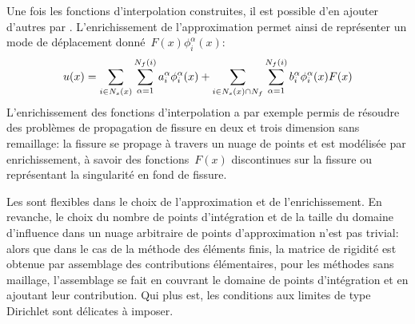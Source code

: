 \medskip
Une fois les fonctions d'interpolation construites, il est possible d'en ajouter d'autres par . L'enrichissement de l'approximation permet ainsi de représenter un mode de déplacement donné~$F(x)\phi_i^\alpha(x)$:
\begin{equation}
u(x) = \displaystyle\sum_{i\in N_s(x)}\displaystyle\sum_{\alpha=1}^{N_f(i)} a_i^\alpha \phi_i^\alpha(x) + \displaystyle\sum_{i\in N_s(x)\cap N_f}\displaystyle\sum_{\alpha=1}^{N_f(i)} b_i^\alpha\phi_i^\alpha(x)F(x)
\end{equation}
L'enrichissement des fonctions d'interpolation a par exemple permis de résoudre des problèmes de propagation de fissure en deux et trois dimension sans remaillage: la fissure se propage à travers un nuage de points et est modélisée par enrichissement, à savoir des fonctions~$F(x)$ discontinues sur la fissure ou représentant la singularité en fond de fissure.

\medskip
Les  sont flexibles dans le choix de l'approximation et de l'enrichissement. En revanche, le choix du nombre de points d'intégration et de la taille du domaine d'influence dans un nuage arbitraire de points d'approximation n'est pas trivial: alors que dans le cas de la méthode des éléments finis, la matrice de rigidité est obtenue par assemblage des contributions élémentaires, pour les méthodes sans maillage, l'assemblage se fait en couvrant le domaine de points d'intégration et en ajoutant leur contribution. Qui plus est, les conditions aux limites de type Dirichlet sont délicates à imposer.



\medskip
